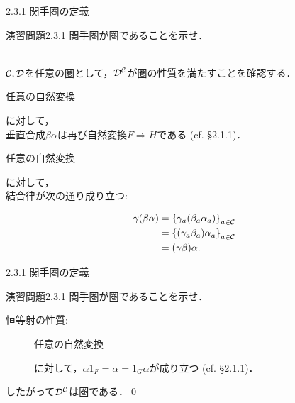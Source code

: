 \documentclass[uplatex,a4paper,dvipdfmx,aspectratio=169,10pt]{beamer}
\begin{document}
\begin{frame}[fragile]{2.3.1 関手圏の定義}
    \begin{exampleblock}{演習問題2.3.1}
        関手圏が圏であることを示せ．
    \end{exampleblock}
    \\
    $\mathcal{C}, \mathcal{D}$を任意の圏として，$\mathcal{D}^{\mathcal{C}}$が圏の性質を満たすことを確認する．
    \begin{description}[射の合成の結合律:]
        \item[射の合成の閉性:] 任意の自然変換に対して，\\
            垂直合成$\beta \alpha$は再び自然変換$F \Rightarrow H$である (cf. \S 2.1.1)．
        \item[射の合成の結合律:] 任意の自然変換に対して，\\
            結合律が次の通り成り立つ:
    \end{description}
    \begin{align*}
        \gamma(\beta\alpha) &= \qty{\gamma_a (\beta_a \alpha_a)}_{a \in \mathcal{C}} \\
                            &= \qty{(\gamma_a\beta_a) \alpha_a}_{a \in \mathcal{C}} \\
                            &= (\gamma \beta) \alpha.
    \end{align*}
\end{frame}
\begin{frame}[fragile]{2.3.1 関手圏の定義}
    \begin{exampleblock}{演習問題2.3.1}
        関手圏が圏であることを示せ．
    \end{exampleblock}
    \begin{description}
        \item[恒等射の性質:] 任意の自然変換に対して，$\alpha 1_F = \alpha = 1_G \alpha$が成り立つ (cf. \S 2.1.1)．
    \end{description}
    したがって$\mathcal{D}^{\mathcal{C}}$は圏である．\qed
\end{frame}
\end{document}
